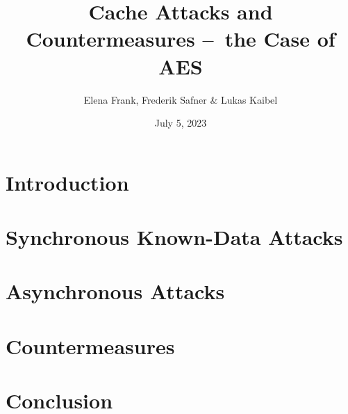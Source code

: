 \documentclass{article}
\title{\textbf{Cache Attacks and Countermeasures – the Case of AES}}
\author{Elena Frank, Frederik Safner \& Lukas Kaibel}
\date{July 5, 2023}
\begin{document}
\maketitle

\tableofcontents

\newpage

\section{Introduction}


\section{Synchronous Known-Data Attacks}


\section{Asynchronous Attacks}


\section{Countermeasures}


\section{Conclusion}

\end{document}
